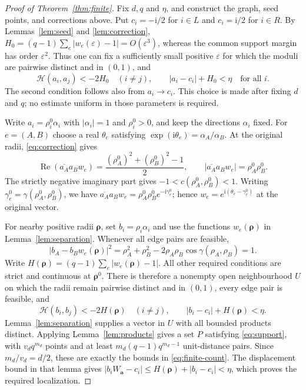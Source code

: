\documentclass[a4paper,11pt]{amsart}
\theoremstyle{remark}
\newcommand{\ii}{\mathrm i}
\newcommand{\Hh}{\mathcal H}
\begin{document}
\begin{proof}[Proof of Theorem~\ref{thm:finite}]
Fix $d,q$ and $\eta$, and construct the graph, seed points, and
corrections above. Put $c_i=-\ii/2$ for $i\in L$ and $c_i=\ii/2$ for
$i\in R$.
By Lemmas~\ref{lem:seed} and \ref{lem:correction},
$H_0=(q-1)\sum_e|w_e(\varepsilon)-1|=O(\varepsilon^3)$,
whereas the common support margin has order $\varepsilon^2$.
Thus one can fix a sufficiently small positive $\varepsilon$ for which
the moduli are pairwise distinct and in $(0,1)$, and
\begin{equation}\label{eq:open-conditions}
 \Hh(a_i,a_j)<-2H_0\quad(i\ne j),\qquad
 |a_i-c_i|+H_0<\eta\quad\text{for all }i.
\end{equation}
The second condition follows also from $a_i\to c_i$.
This choice is made after fixing $d$ and $q$; no estimate uniform in
those parameters is required.

Write $a_i=\rho_i^0\alpha_i$ with $|\alpha_i|=1$ and
$\rho_i^0>0$, and keep the directions $\alpha_i$ fixed.
For $e=(A,B)$ choose a real $\theta_e$ satisfying
$\exp(\ii\theta_e)=\alpha_A/\alpha_B$.
At the original radii, \eqref{eq:correction} gives
\[
 \operatorname{Re}(\overline{a_A}a_Bw_e)
   =\frac{(\rho_A^0)^2+(\rho_B^0)^2-1}{2},\qquad
 |\overline{a_A}a_Bw_e|=\rho_A^0\rho_B^0.
\]
The strictly negative imaginary part gives
$-1<c(\rho_A^0,\rho_B^0)<1$. Writing
$\gamma_e^0=\gamma(\rho_A^0,\rho_B^0)$, we have
$\overline{a_A}a_Bw_e=\rho_A^0\rho_B^0e^{-\ii\gamma_e^0}$;
hence $w_e=e^{\ii(\theta_e-\gamma_e^0)}$ at the original vector.

For nearby positive radii $\boldsymbol\rho$, set
$b_i=\rho_i\alpha_i$ and use the functions $w_e(\boldsymbol\rho)$ in
Lemma~\ref{lem:separation}. Whenever all edge pairs are feasible,
\[
 |b_A-b_Bw_e(\boldsymbol\rho)|^2
 =\rho_A^2+\rho_B^2-
                  2\rho_A\rho_B\cos\gamma(\rho_A,\rho_B)=1.
\]
Write $H(\boldsymbol\rho)=(q-1)\sum_e|w_e(\boldsymbol\rho)-1|$.
All other required conditions are strict and continuous at
$\boldsymbol\rho^0$.
There is therefore a nonempty open neighbourhood $U$ on which the
radii remain pairwise distinct and in $(0,1)$, every edge pair is
feasible, and
\[
 \Hh(b_i,b_j)<-2H(\boldsymbol\rho)\quad(i\ne j),\qquad
 |b_i-c_i|+H(\boldsymbol\rho)<\eta.
\]
Lemma~\ref{lem:separation} supplies a vector in $U$ with all bounded
products distinct. Applying Lemma~\ref{lem:products} gives a set $P$
satisfying \eqref{eq:support}, with $v_dq^{m_d}$ points and at least
$m_d(q-1)q^{m_d-1}$ unit-distance pairs. Since $m_d/v_d=d/2$,
these are exactly the bounds in \eqref{eq:finite-count}.
The displacement bound in that lemma gives
$|b_iW_{\mathbf a}-c_i|\le H(\boldsymbol\rho)+|b_i-c_i|<\eta$,
which proves the required localization.
\end{proof}
\end{document}
